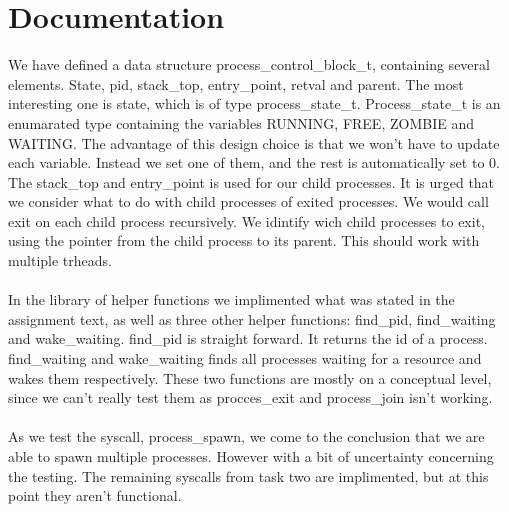 \documentclass[12pt]{article}
\begin{document}
\section*{Documentation}

We have defined a data structure process\_control\_block\_t, containing several elements. State, pid, stack\_top, entry\_point, retval and parent. The most interesting one is state, which is of type process\_state\_t. Process\_state\_t is an enumarated type containing the variables RUNNING, FREE, ZOMBIE and WAITING. The advantage of this design choice is that we won't have to update each variable. Instead we set one of them, and the rest is automatically set to 0.\\ 
The stack\_top and entry\_point is used for our child processes. It is urged that we consider what to do with child processes of exited processes. We would call exit on each child process recursively. We idintify wich child processes to exit, using the pointer from the child process to its parent. This should work with multiple trheads.\\\\
In the library of helper functions we implimented what was stated in the assignment text, as well as three other helper functions: find\_pid, find\_waiting and wake\_waiting. find\_pid is straight forward. It returns the id of a process. find\_waiting and wake\_waiting finds all processes waiting for a resource and wakes them respectively. These two functions are mostly on a conceptual level, since we can't really test them as procces\_exit and process\_join isn't working.
\\\\
As we test the syscall, process\_spawn, we come to the conclusion that we are able to spawn multiple processes. However with a bit of uncertainty concerning the testing. The remaining syscalls from task two are implimented, but at this point they aren't functional.
\end{document}
